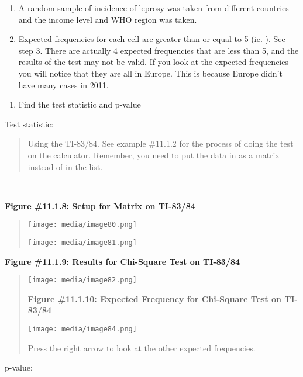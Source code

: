 \documentclass[]{book}
\providecommand{\tightlist}{%
  \setlength{\itemsep}{0pt}\setlength{\parskip}{0pt}}
\begin{document}
\begin{enumerate}
\def\labelenumi{\alph{enumi}.}
\item
  A random sample of incidence of leprosy was taken from different countries and the income level and WHO region was taken.
\item
  Expected frequencies for each cell are greater than or equal to 5 (ie. ). See step 3. There are actually 4 expected frequencies that are less than 5, and the results of the test may not be valid. If you look at the expected frequencies you will notice that they are all in Europe. This is because Europe didn't have many cases in 2011.
\end{enumerate}

\begin{enumerate}
\def\labelenumi{\arabic{enumi}.}
\setcounter{enumi}{2}
\tightlist
\item
  Find the test statistic and p-value
\end{enumerate}

Test statistic:

\begin{quote}
Using the TI-83/84. See example \#11.1.2 for the process of doing the test on the calculator. Remember, you need to put the data in as a matrix instead of in the list.
\end{quote}

\textbf{\\
}

\textbf{Figure \#11.1.8: Setup for Matrix on TI-83/84}

\begin{quote}
\texttt{[image: media/image80.png]}

\texttt{[image: media/image81.png]}
\end{quote}

\textbf{Figure \#11.1.9: Results for Chi-Square Test on TI-83/84}

\begin{quote}
\texttt{[image: media/image82.png]}

\textbf{Figure \#11.1.10: Expected Frequency for Chi-Square Test on
TI-83/84}

\texttt{[image: media/image84.png]}

Press the right arrow to look at the other expected frequencies.
\end{quote}

p-value:
\end{document}
